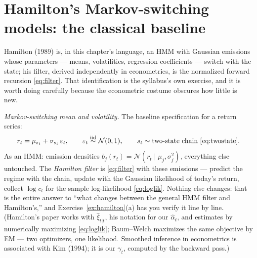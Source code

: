 \documentclass[11pt]{article}
\numberwithin{equation}{section}
\theoremstyle{plain}
\theoremstyle{definition}
\theoremstyle{remark}
\newcounter{exercise}
\newcommand{\Normal}{\mathcal{N}}
\newcommand{\alh}{\hat{\alpha}}
\newcommand{\resp}{\gamma}
\begin{document}
\section{Hamilton's Markov-switching models: the classical baseline}\label{sec:hamilton}

Hamilton (1989) is, in this chapter's language, an HMM with Gaussian emissions whose parameters --- means, volatilities, regression coefficients --- switch with the state; his filter, derived independently in econometrics, is the normalized forward recursion \eqref{eq:filter}. That identification is the syllabus's own exercise, and it is worth doing carefully because the econometric costume obscures how little is new.

\emph{Markov-switching mean and volatility.} The baseline specification for a return series:
\begin{equation}
r_t = \mu_{s_t} + \sigma_{s_t}\, \varepsilon_t,
\qquad \varepsilon_t \overset{\text{iid}}{\sim} \Normal(0, 1),
\qquad s_t \sim \text{two-state chain \eqref{eq:twostate}}.
\label{eq:msmodel}
\end{equation}
As an HMM: emission densities $b_j(r_t) = \Normal(r_t \mid \mu_j, \sigma_j^2)$, everything else untouched. The \emph{Hamilton filter} is \eqref{eq:filter} with these emissions --- predict the regime with the chain, update with the Gaussian likelihood of today's return, collect $\log c_t$ for the sample log-likelihood \eqref{eq:loglik}. Nothing else changes: that is the entire answer to ``what changes between the general HMM filter and Hamilton's,'' and Exercise~\ref{ex:hamilton}(a) has you verify it line by line. (Hamilton's paper works with $\hat\xi_{t|t}$, his notation for our $\alh_t$, and estimates by numerically maximizing \eqref{eq:loglik}; Baum--Welch maximizes the same objective by EM --- two optimizers, one likelihood. Smoothed inference in econometrics is associated with Kim (1994); it is our $\resp_t$, computed by the backward pass.)
\end{document}
